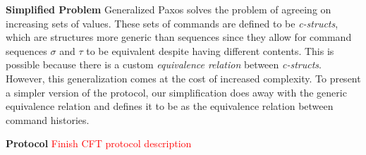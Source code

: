 \textbf{Simplified Problem} Generalized Paxos solves the problem of agreeing on increasing sets of values. These sets of commands are defined to be \textit{c-structs}, which are structures more generic than sequences since they allow for command sequences $\sigma$ and $\tau$ to be equivalent despite having different contents. This is possible because there is a custom \textit{equivalence relation} between \textit{c-structs}. However, this generalization comes at the cost of increased complexity. To present a simpler version of the protocol, our simplification does away with the generic equivalence relation and defines it to be as the equivalence relation between command histories.  \par
\textbf{Protocol} \textcolor{red}{Finish CFT protocol description}